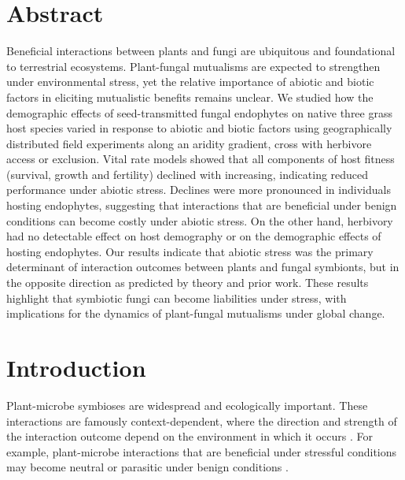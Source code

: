 \documentclass[12pt]{article}\usepackage[]{graphicx}\usepackage[dvipsnames]{xcolor}
\begin{document}
\section*{Abstract}
Beneficial interactions between plants and fungi are ubiquitous and foundational to terrestrial ecosystems.
Plant-fungal mutualisms are expected to strengthen under environmental stress, yet the relative importance of abiotic and biotic factors in eliciting mutualistic benefits remains unclear.
We studied how the demographic effects of seed-transmitted fungal endophytes on native three grass host species varied in response to abiotic and biotic factors using geographically distributed field experiments along an aridity gradient, cross with herbivore access or exclusion. 
Vital rate models showed that all components of host fitness (survival, growth and fertility) declined with increasing, indicating reduced performance under abiotic stress. 
Declines were more pronounced in individuals hosting endophytes, suggesting that interactions that are beneficial under benign conditions can become costly under abiotic stress. 
On the other hand, herbivory had no detectable effect on host demography or on the demographic effects of hosting endophytes. 
Our results indicate that abiotic stress was the primary determinant of interaction outcomes between plants and fungal symbionts, but in the opposite direction as predicted by theory and prior work. 
These results highlight that symbiotic fungi can become liabilities under stress, with implications for the dynamics of plant-fungal mutualisms under global change.
\newpage
\section*{Introduction}
Plant-microbe symbioses are widespread and ecologically important. 
These interactions are famously context-dependent, where the direction and strength of the interaction outcome depend on the environment in which it occurs \citep{hoeksema2015context, bronstein1994conditional}.
For example, plant-microbe  interactions that are beneficial under stressful conditions  may become neutral or parasitic under benign conditions \citep{giauque2019endophyte}. 
\end{document}

